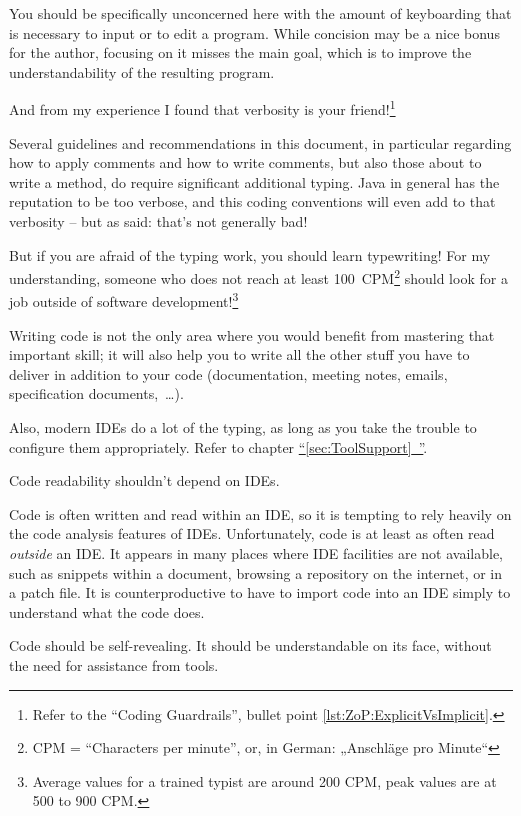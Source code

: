 \documentclass[11pt,a4paper, titlepage, parskip=half, headsepline, footsepline, cleardoublepage=current, headheight=1cm]{scrbook}
\newcommand*{\tqfullref}[1]{\hyperref[{#1}]{“\ref*{#1}~\nameref*{#1}”}}
\begin{document}
You should be specifically unconcerned here with the amount of keyboarding that is necessary to input or to edit a program. While concision may be a nice bonus for the author, focusing on it misses the main goal, which is to improve the understandability of the resulting program.

And from my experience I found that verbosity is your friend!\footnote{Refer to the “Coding Guardrails”, bullet point \ref{lst:ZoP:ExplicitVsImplicit}.}

Several guidelines and recommendations in this document, in particular regarding how to apply comments and how to write comments, but also those about to write a method, do require significant additional typing. Java in general has the reputation to be too verbose, and this coding conventions will even add to that verbosity – but as said: that's not generally bad!

But if you are afraid of the typing work, you should learn typewriting! For my understanding, someone who does not reach at least 100~CPM\footnote{CPM = “Characters per minute”, or, in German: „Anschläge pro Minute“} should look for a job outside of software development!\footnote{Average values for a trained typist are around 200 CPM, peak values are at 500 to 900 CPM.}

Writing code is not the only area where you would benefit from mastering that important skill; it will also help you to write all the other stuff you have to deliver in addition to your code (documentation, meeting notes, emails, specification documents,~…).

Also, modern IDEs do a lot of the typing, as long as you take the trouble to configure them appropriately. Refer to chapter \tqfullref{sec:ToolSupport}.

Code readability shouldn’t depend on IDEs.\autocite{Marks:LocalVariableTypeInference:NoIDEDependency}

Code is often written and read within an IDE, so it is tempting to rely heavily on the code analysis features of IDEs. Unfortunately, code is at least as often read \textit{outside} an IDE. It appears in many places where IDE facilities are not available, such as snippets within a document, browsing a repository on the internet, or in a patch file. It is counterproductive to have to import code into an IDE simply to understand what the code does.

Code should be self-revealing. It should be understandable on its face, without the need for assistance from tools.
\end{document}
